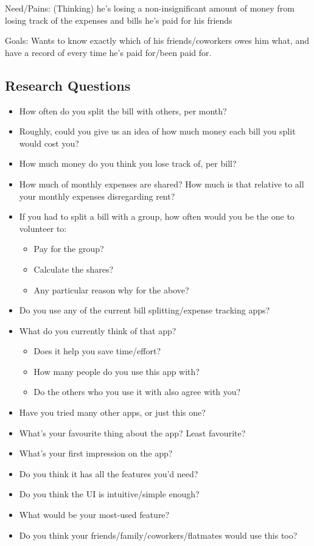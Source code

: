 \documentclass[a4wide, 10pt]{article}
\begin{document}
Need/Pains:
(Thinking) he’s losing a non-insignificant amount of money from losing track of the expenses and bills he’s paid for his friends

Goals: 
Wants to know exactly which of his friends/coworkers owes him what, and have a record of every time he’s paid for/been paid for.

\subsection{Research Questions}
\vspace{-2ex}
\begin{itemize}
  \item How often do you split the bill with others, per month?
  \item Roughly, could you give us an idea of how much money each bill you split would cost you?
  \item How much money do you think you lose track of, per bill?
  \item How much of monthly expenses are shared? How much is that relative to all your monthly expenses disregarding rent?
  \item If you had to split a bill with a group, how often would you be the one to volunteer to:
  \begin{itemize}
    \item Pay for the group?
    \item Calculate the shares?
    \item Any particular reason why for the above?
  \end{itemize}
  \item Do you use any of the current bill splitting/expense tracking apps?
  \item What do you currently think of that app?
  \begin{itemize}
    \item Does it help you save time/effort?
    \item How many people do you use this app with?
    \item Do the others who you use it with also agree with you?
  \end{itemize}
  \item Have you tried many other apps, or just this one?
  \item What’s your favourite thing about the app? Least favourite?
  \item What’s your first impression on the app?
  \item Do you think it has all the features you’d need?
  \item Do you think the UI is intuitive/simple enough?
  \item What would be your most-used feature?
  \item Do you think your friends/family/coworkers/flatmates would use this too?
\end{itemize}
\end{document}
